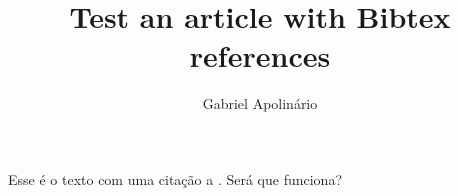 \documentclass[a4paper,10pt]{article}
\title{Test an article with Bibtex references}
\author{Gabriel Apolinário}
\begin{document}
\maketitle

Esse é o texto com uma citação a \cite{glauber1963time}. Será que funciona?



\end{document}
